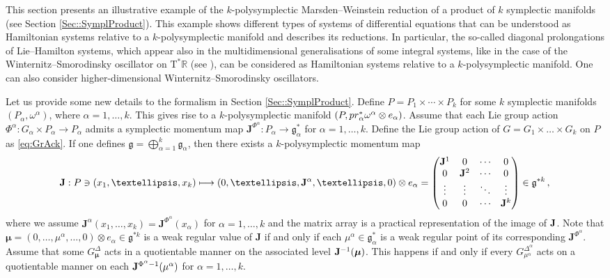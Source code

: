 \documentclass[11pt]{article}
\theoremstyle{plain}
\theoremstyle{definition}
\newcommand{\T}{\mathrm{T}}
\newcommand{\x}{\times}
\numberwithin{equation}{section}
\begin{document}
This section presents an illustrative example of the \texorpdfstring{$k$}{}-polysymplectic Marsden--Weinstein reduction of a product of \texorpdfstring{$k$}{} symplectic manifolds (see Section \ref{Sec::SymplProduct}). This example shows different types of systems of differential equations that can be understood as Hamiltonian systems relative to a $k$-polysymplectic manifold and describes its reductions. In particular, the so-called diagonal prolongations of Lie--Hamilton systems, which appear also in the multidimensional generalisations of some integral systems, like in the case of the Winternitz--Smorodinsky oscillator on $\T^*\mathbb{R}$ (see \cite{LS_20}), can be considered as Hamiltonian systems relative to a $k$-polysymplectic manifold. One can also consider higher-dimensional Winternitz--Smorodinsky oscillators.

Let us provide some new details to the formalism in Section \ref{Sec::SymplProduct}. Define $P=P_1\times\dotsb\times P_k$ for some $k$ symplectic manifolds $(P_\alpha,\omega^\alpha)$, where $\alpha=1,\dotsc,k$. This gives rise to a $k$-polysymplectic manifold $(P,{\rm pr}_\alpha^*\omega^\alpha\otimes e_\alpha)$. Assume that each Lie group action $\Phi^\alpha: G_\alpha\x P_\alpha\rightarrow P_\alpha$  admits a symplectic momentum map $\mathbf{J}^{\Phi^\alpha}: P_\alpha\rightarrow\mathfrak{g}_\alpha^*$ for $\alpha=1,\ldots,k$. Define the Lie group action of $G=G_1\times\ldots\times G_k$ on $P$ as \eqref{eq:GrAck}.
 If one defines $\mathfrak{g}=\bigoplus_{\alpha =1}^k\mathfrak{g}_\alpha$, then there exists a $k$-polysymplectic momentum map 
\[
\mathbf{J}:P\ni(x_1,\ldots,x_k)\longmapsto
(0,\ldots, {\bf J}^\alpha,\ldots,0)\otimes {e}_\alpha = \begin{pmatrix}
\mathbf{J}^{1}&0 &\dotsb & 0\\ 
0& \mathbf{J}^{2}&\dotsb &0\\ 
\vdots&\vdots &\ddots&\vdots \\ 
0 &0 &\dotsb&\mathbf{J}^{k}\end{pmatrix}\in \mathfrak{g}^{*k}\,,
\]
where we assume $\mathbf{J}^\alpha(x_1,\ldots,x_k)=\mathbf{J}^{\Phi^\alpha}(x_\alpha)$ for $\alpha=1,\ldots,k$ and the matrix array is a practical representation of the image of ${\bf J}$.
Note that $\bm\mu=(0,\ldots,\mu^\alpha,\ldots,0)\otimes {e}_\alpha\in \mathfrak{g}^{*k}$ is a weak regular value of $\mathbf{J}$ if and only if each $\mu^\alpha\in\mathfrak{g}_\alpha^*$ is a weak regular point of its corresponding $\mathbf{J}^{\Phi^\alpha}$. Assume that some $G^\Delta_{\bm \mu}$ acts in a quotientable manner on the associated level ${\bf J}^{-1}(
\bm \mu)$. This happens if and only if every $G^{\Delta^\alpha}_{\mu^\alpha}$ acts on a quotientable manner on each ${\bf J}^{\Phi^\alpha-1}(\mu^\alpha)$ for $\alpha=1,\ldots,k$. %
\end{document}
